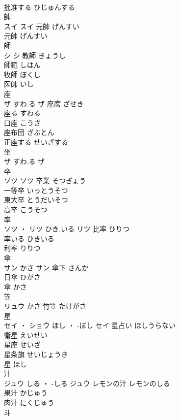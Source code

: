 \documentclass[8pt]{extreport}
\begin{document}
\begin{CJK}{UTF8}{min}
\\	批准する	ひじゅんする	
\\	帥	
\\	スイ		スイ	元帥	げんすい	
\\	元帥	げんすい	
\\	師	
\\	シ		シ	教師	きょうし	
\\	師範	しはん	
\\	牧師	ぼくし	
\\	医師	いし	
\\	座	
\\	ザ	すわ.る	ザ	座席	ざせき	
\\	座る	すわる	
\\	口座	こうざ	
\\	座布団	ざぶとん	
\\	正座する	せいざする	
\\	坐	
\\	ザ	すわ.る	ザ																																			
\\	卒	
\\	ソツ		ソツ	卒業	そつぎょう	
\\	一等卒	いっとうそつ	
\\	東大卒	とうだいそつ	
\\	高卒	こうそつ	
\\	率	
\\	ソツ ・ リツ	ひき.いる	リツ	比率	ひりつ	
\\	率いる	ひきいる	
\\	利率	りりつ	
\\	傘	
\\	サン	かさ	サン	傘下	さんか	
\\	日傘	ひがさ	
\\	傘	かさ	
\\	笠	
\\	リュウ	かさ														竹笠	たけがさ	
\\	星	
\\	セイ ・ ショウ	ほし ・ -ぼし	セイ	星占い	ほしうらない	
\\	衛星	えいせい	
\\	星座	せいざ	
\\	星条旗	せいじょうき	
\\	星	ほし	
\\	汁	
\\	ジュウ	しる ・ -しる	ジュウ	レモンの汁	レモンのしる	
\\	果汁	かじゅう	
\\	肉汁	にくじゅう	
\\	斗	

\end{CJK}
\end{document}
